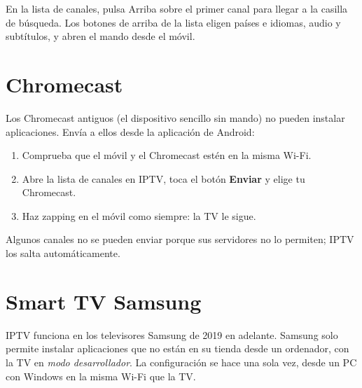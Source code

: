 En la lista de canales, pulsa Arriba sobre el primer canal para llegar a la
casilla de búsqueda. Los botones de arriba de la lista eligen países e
idiomas, audio y subtítulos, y abren el mando desde el móvil.


\section{Chromecast}
\label{sec:chromecast}

Los Chromecast antiguos (el dispositivo sencillo sin mando) no pueden
instalar aplicaciones. Envía a ellos desde la aplicación de Android:
\begin{enumerate}
  \item Comprueba que el móvil y el Chromecast estén en la misma Wi-Fi.
  \item Abre la lista de canales en IPTV, toca el botón \textbf{Enviar} y
        elige tu Chromecast.
  \item Haz zapping en el móvil como siempre: la TV le sigue.
\end{enumerate}
Algunos canales no se pueden enviar porque sus servidores no lo permiten;
IPTV los salta automáticamente.

\section{Smart TV Samsung}

IPTV funciona en los televisores Samsung de 2019 en adelante. Samsung solo
permite instalar aplicaciones que no están en su tienda desde un ordenador,
con la TV en \emph{modo desarrollador}. La configuración se hace una sola vez,
desde un PC con Windows en la misma Wi-Fi que la TV.

